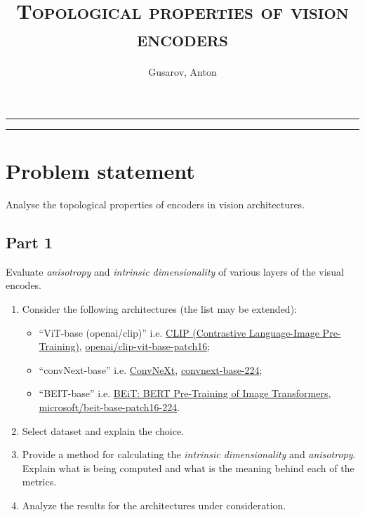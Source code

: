 \documentclass[
  11pt,
  a4paper,
  onecolumn]{article}
\author{
  Gusarov, Anton
}
\title{\textsc{Topological properties of vision encoders}}
\begin{document}
\maketitle
\par\noindent\rule{\columnwidth}{0.4pt}
\vspace{-5ex}
\tableofcontents
\vspace{-1ex}
\par\noindent\rule{\columnwidth}{0.4pt}

\section{Problem statement}\label{problem-st}

Analyse the topological properties of encoders in vision architectures.

\subsection*{Part 1}

Evaluate \textit{anisotropy} and \textit{intrinsic dimensionality} of various layers of the visual encodes.

\begin{enumerate}
  \item[1.1] Consider the following architectures (the list may be extended):
  \begin{itemize}
    \item ``ViT-base (openai/clip)'' i.e. \href{https://github.com/openai/CLIP/tree/main}{CLIP (Contrastive Language-Image Pre-Training)}, \href{https://huggingface.co/openai/clip-vit-base-patch16}{openai/clip-vit-base-patch16};
    \item ``convNext-base'' i.e. \href{https://github.com/facebookresearch/ConvNeXt}{ConvNeXt}, \href{https://huggingface.co/facebook/convnext-base-224}{convnext-base-224};
    \item ``BEIT-base'' i.e. \href{https://github.com/microsoft/unilm/tree/master/beit}{BEiT: BERT Pre-Training of Image Transformers}, \href{https://huggingface.co/microsoft/beit-base-patch16-224}{microsoft/beit-base-patch16-224}.
  \end{itemize}

  \item[1.2] Select dataset and explain the choice.
  \item[1.3] Provide a method for calculating the \textit{intrinsic dimensionality} and \textit{anisotropy}. Explain what is being computed and what is the meaning behind each of the metrics.
  \item[1.4] Analyze the results for the architectures under consideration.  
\end{enumerate}
\end{document}
